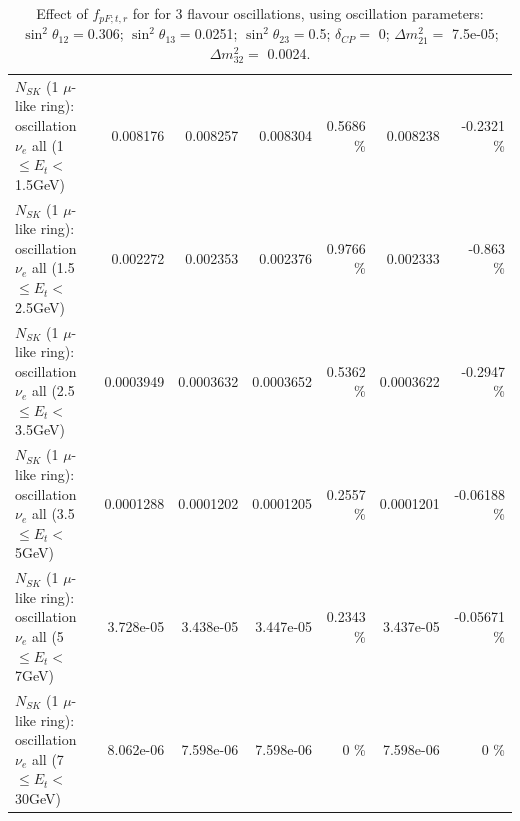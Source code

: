 \begin{table}
\begin{tabular}{| l | r | r | r  r | r  r |}
$N_{SK}$ (1 $\mu$-like ring): oscillation $\nu_{e}$ all (1 $\leq E_{t} <$ 1.5GeV) &        0.008176 &        0.008257 &        0.008304 &   0.5686 \%  &        0.008238 &  -0.2321 \%  \\ 
$N_{SK}$ (1 $\mu$-like ring): oscillation $\nu_{e}$ all (1.5 $\leq E_{t} <$ 2.5GeV) &        0.002272 &        0.002353 &        0.002376 &   0.9766 \%  &        0.002333 &   -0.863 \%  \\ 
$N_{SK}$ (1 $\mu$-like ring): oscillation $\nu_{e}$ all (2.5 $\leq E_{t} <$ 3.5GeV) &       0.0003949 &       0.0003632 &       0.0003652 &   0.5362 \%  &       0.0003622 &  -0.2947 \%  \\ 
$N_{SK}$ (1 $\mu$-like ring): oscillation $\nu_{e}$ all (3.5 $\leq E_{t} <$ 5GeV) &       0.0001288 &       0.0001202 &       0.0001205 &   0.2557 \%  &       0.0001201 & -0.06188 \%  \\ 
 $N_{SK}$ (1 $\mu$-like ring): oscillation $\nu_{e}$ all (5 $\leq E_{t} <$ 7GeV) &       3.728e-05 &       3.438e-05 &       3.447e-05 &   0.2343 \%  &       3.437e-05 & -0.05671 \%  \\ 
$N_{SK}$ (1 $\mu$-like ring): oscillation $\nu_{e}$ all (7 $\leq E_{t} <$ 30GeV) &       8.062e-06 &       7.598e-06 &       7.598e-06 &        0 \%  &       7.598e-06 &        0 \%  \\ 
\hline
\hline
\end{tabular}
\caption{ Effect of $f_{pF; t, r}$ for for 3 flavour oscillations, using oscillation parameters:  $\sin^2\theta_{12} = $0.306; $\sin^2\theta_{13} = $0.0251; $\sin^2\theta_{23} = $0.5; $\delta_{CP} = $        0; $\Delta m^2_{21} = $    7.5e-05; $\Delta m^2_{32} = $    0.0024. }
\label{tab:num_xsec_pf_1RmuT_3f_osc_t13:0.0251}
\end{table}
\clearpage
